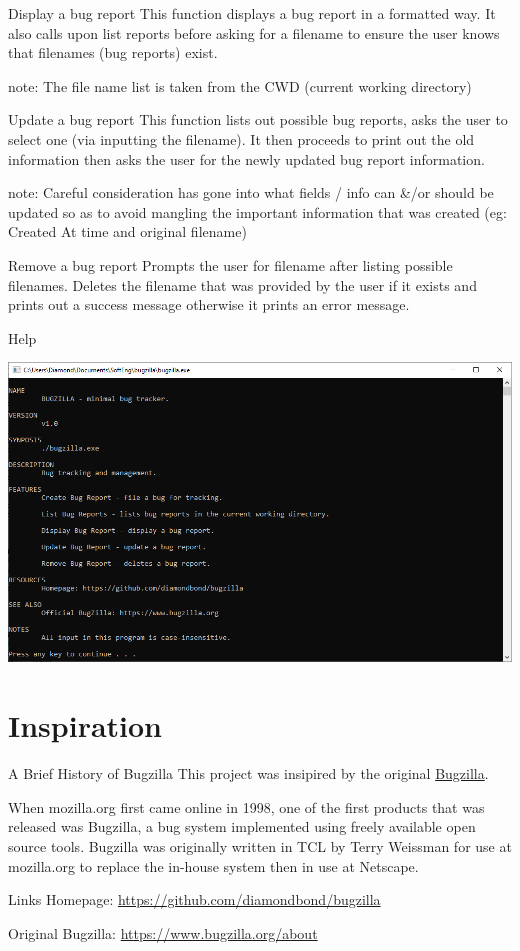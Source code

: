 \documentclass[bigger]{beamer}
\begin{document}
\begin{frame}[label={sec:orge3dc7f0}]{Display a bug report}
This function displays a bug report in a formatted way.
It also calls upon list reports before asking for a filename to ensure the user knows that filenames (bug reports) exist.

note: The file name list is taken from the CWD (current working directory)
\end{frame}

\begin{frame}[label={sec:org17391ac}]{Update a bug report}
This function lists out possible bug reports, asks the user to select one (via inputting the filename).
It then proceeds to print out the old information then asks the user for the newly updated bug report information.

note: Careful consideration has gone into what fields / info can \&/or should be updated so as to avoid mangling the important information that was created (eg: Created At time and original filename)
\end{frame}

\begin{frame}[label={sec:orgd2e98e8}]{Remove a bug report}
Prompts the user for filename after listing possible filenames.
Deletes the filename that was provided by the user if it exists and prints out a success message otherwise it prints an error message.
\end{frame}

\begin{frame}[label={sec:org6638927}]{Help}
\begin{center}
\includegraphics[width=.9\linewidth]{../img/help.png}
\end{center}
\end{frame}

\section{Inspiration}
\label{sec:org60af09c}
\begin{frame}[label={sec:orge0fc65d}]{A Brief History of Bugzilla}
This project was insipired by the original \href{https://www.bugzilla.org}{Bugzilla}.

When mozilla.org first came online in 1998, one of the first products that was released was Bugzilla, a bug system implemented using freely available open source tools. Bugzilla was originally written in TCL by Terry Weissman for use at mozilla.org to replace the in-house system then in use at Netscape. 
\end{frame}

\begin{frame}[label={sec:org6204bc4}]{Links}
Homepage: \url{https://github.com/diamondbond/bugzilla}

Original Bugzilla: \url{https://www.bugzilla.org/about}
\end{frame}
\end{document}
